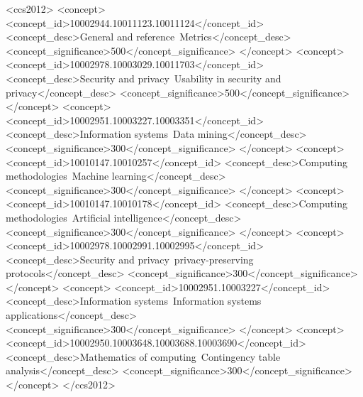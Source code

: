 \documentclass[manuscript,screen,review,anonymous]{acmart}
\begin{document}
\begin{CCSXML}
  <ccs2012>
     <concept>
         <concept_id>10002944.10011123.10011124</concept_id>
         <concept_desc>General and reference~Metrics</concept_desc>
         <concept_significance>500</concept_significance>
         </concept>
     <concept>
         <concept_id>10002978.10003029.10011703</concept_id>
         <concept_desc>Security and privacy~Usability in security and privacy</concept_desc>
         <concept_significance>500</concept_significance>
         </concept>
     <concept>
         <concept_id>10002951.10003227.10003351</concept_id>
         <concept_desc>Information systems~Data mining</concept_desc>
         <concept_significance>300</concept_significance>
         </concept>
     <concept>
         <concept_id>10010147.10010257</concept_id>
         <concept_desc>Computing methodologies~Machine learning</concept_desc>
         <concept_significance>300</concept_significance>
         </concept>
     <concept>
         <concept_id>10010147.10010178</concept_id>
         <concept_desc>Computing methodologies~Artificial intelligence</concept_desc>
         <concept_significance>300</concept_significance>
         </concept>
     <concept>
         <concept_id>10002978.10002991.10002995</concept_id>
         <concept_desc>Security and privacy~privacy-preserving protocols</concept_desc>
         <concept_significance>300</concept_significance>
         </concept>
     <concept>
         <concept_id>10002951.10003227</concept_id>
         <concept_desc>Information systems~Information systems applications</concept_desc>
         <concept_significance>300</concept_significance>
         </concept>
     <concept>
         <concept_id>10002950.10003648.10003688.10003690</concept_id>
         <concept_desc>Mathematics of computing~Contingency table analysis</concept_desc>
         <concept_significance>300</concept_significance>
         </concept>
   </ccs2012>
\end{CCSXML}

\end{document}
